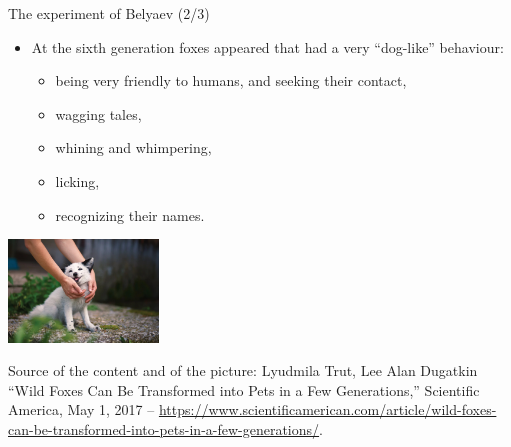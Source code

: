 \documentclass{beamer}
\begin{document}
\begin{frame}
{\centerline{The experiment of Belyaev (2/3)}}


\begin{itemize}
\item At the sixth generation foxes appeared that had a very ``dog-like'' behaviour:
\begin{itemize}
\item being very friendly to humans, and seeking their contact,
\item wagging tales,
\item whining and whimpering,
\item licking,
\item recognizing their names.
\end{itemize}  
\end{itemize} 

\begin{center}
 \includegraphics[width=4cm]{P2023.AIBCCSS.Change/tamefoxes.jpg}
 
 \end{center}


\begin{center}
\tiny
Source of the content and of the picture: Lyudmila Trut, Lee Alan Dugatkin ``Wild Foxes Can Be Transformed into Pets in a Few Generations,'' Scientific America, May 1, 2017 -- \url{https://www.scientificamerican.com/article/wild-foxes-can-be-transformed-into-pets-in-a-few-generations/}.
\end{center}

\end{frame}
\end{document}
